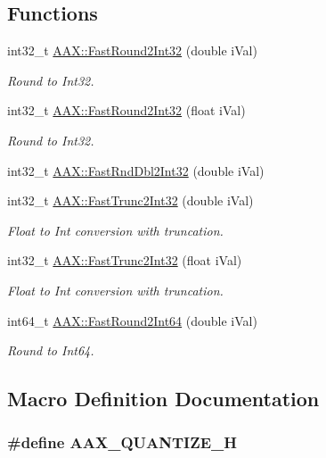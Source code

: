 \subsection*{Functions}
\begin{DoxyCompactItemize}
\item 
int32\+\_\+t \hyperlink{a00288_af0bbeabd87aa74be4ecca4f767aedc41}{A\+A\+X\+::\+Fast\+Round2\+Int32} (double i\+Val)
\begin{DoxyCompactList}\small\item\em Round to Int32. \end{DoxyCompactList}\item 
int32\+\_\+t \hyperlink{a00288_a56cd923aeae2bd544f1fb43fff6b0b3d}{A\+A\+X\+::\+Fast\+Round2\+Int32} (float i\+Val)
\begin{DoxyCompactList}\small\item\em Round to Int32. \end{DoxyCompactList}\item 
int32\+\_\+t \hyperlink{a00288_ae690c060a5ff4cb96e77335231a29673}{A\+A\+X\+::\+Fast\+Rnd\+Dbl2\+Int32} (double i\+Val)
\item 
int32\+\_\+t \hyperlink{a00288_ad2b2872b49146cf0859c403fea702a39}{A\+A\+X\+::\+Fast\+Trunc2\+Int32} (double i\+Val)
\begin{DoxyCompactList}\small\item\em Float to Int conversion with truncation. \end{DoxyCompactList}\item 
int32\+\_\+t \hyperlink{a00288_a9a8bc8a47f13b4cb1bb84e45bf43fe82}{A\+A\+X\+::\+Fast\+Trunc2\+Int32} (float i\+Val)
\begin{DoxyCompactList}\small\item\em Float to Int conversion with truncation. \end{DoxyCompactList}\item 
int64\+\_\+t \hyperlink{a00288_a7df6b095ea2469f2adce2a895038212e}{A\+A\+X\+::\+Fast\+Round2\+Int64} (double i\+Val)
\begin{DoxyCompactList}\small\item\em Round to Int64. \end{DoxyCompactList}\end{DoxyCompactItemize}


\subsection{Macro Definition Documentation}
\hypertarget{a00287_a8110c1ecf6144fb29de6c94c0572327c}{}
\subsubsection[{A\+A\+X\+\_\+\+Q\+U\+A\+N\+T\+I\+Z\+E\+\_\+\+H}]{\setlength{\rightskip}{0pt plus 5cm}\#define A\+A\+X\+\_\+\+Q\+U\+A\+N\+T\+I\+Z\+E\+\_\+\+H}\label{a00287_a8110c1ecf6144fb29de6c94c0572327c}

